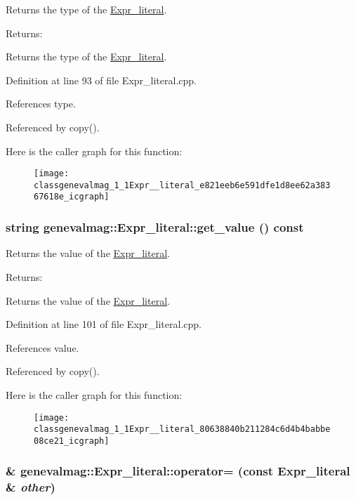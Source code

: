 Returns the type of the \hyperlink{classgenevalmag_1_1Expr__literal}{Expr\_\-literal}. \begin{Desc}
\item[Returns:]\end{Desc}
Returns the type of the \hyperlink{classgenevalmag_1_1Expr__literal}{Expr\_\-literal}. 

Definition at line 93 of file Expr\_\-literal.cpp.

References type.

Referenced by copy().

Here is the caller graph for this function:\nopagebreak
\begin{figure}[H]
\begin{center}
\leavevmode
\texttt{[image: classgenevalmag\_1\_1Expr\_\_literal\_e821eeb6e591dfe1d8ee62a38367618e\_icgraph]}
\end{center}
\end{figure}
\hypertarget{classgenevalmag_1_1Expr__literal_80638840b211284c6d4b4babbe08ce21}{
\subsubsection[{get\_\-value}]{\setlength{\rightskip}{0pt plus 5cm}string genevalmag::Expr\_\-literal::get\_\-value () const}}
\label{classgenevalmag_1_1Expr__literal_80638840b211284c6d4b4babbe08ce21}


Returns the value of the \hyperlink{classgenevalmag_1_1Expr__literal}{Expr\_\-literal}. \begin{Desc}
\item[Returns:]\end{Desc}
Returns the value of the \hyperlink{classgenevalmag_1_1Expr__literal}{Expr\_\-literal}. 

Definition at line 101 of file Expr\_\-literal.cpp.

References value.

Referenced by copy().

Here is the caller graph for this function:\nopagebreak
\begin{figure}[H]
\begin{center}
\leavevmode
\texttt{[image: classgenevalmag\_1\_1Expr\_\_literal\_80638840b211284c6d4b4babbe08ce21\_icgraph]}
\end{center}
\end{figure}
\hypertarget{classgenevalmag_1_1Expr__literal_76f4c6a1fd0fe094b929d6e01868e0ed}{
\subsubsection[{operator=}]{ \& genevalmag::Expr\_\-literal::operator= (const {\bf Expr\_\-literal} \& {\em other})}}
\label{classgenevalmag_1_1Expr__literal_76f4c6a1fd0fe094b929d6e01868e0ed}


